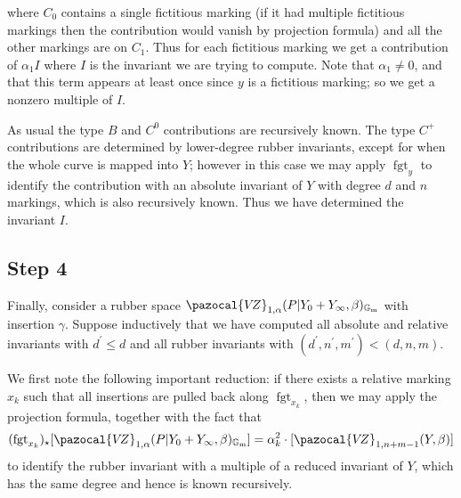 \documentclass[11pt]{amsart}
\newcommand{\sqC}{\scalebox{0.8}[1.3]{$\sqsubset$}}
\newcommand{\VZ}{\pazocal{V\!Z}}
\newcommand{\st}{\star}
\newcommand{\Gm}{\mathbb{G}_{\text{m}}}
\newcommand{\fgt}{\operatorname{fgt}}
\theoremstyle{definition}
\theoremstyle{definition}
\begin{document}
\begin{center}
\end{center}
where $C_0$ contains a single fictitious marking (if it had multiple fictitious markings then the contribution would vanish by projection formula) and all the other markings are on $C_1$. Thus for each fictitious marking we get a contribution of $\alpha_1 I$ where $I$ is the invariant we are trying to compute. Note that $\alpha_1 \neq 0$, and that this term appears at least once since $y$ is a fictitious marking; so we get a nonzero multiple of $I$.

As usual the type $B$ and $C^0$ contributions are recursively known. The type $C^+$ contributions are determined by lower-degree rubber invariants, except for when the whole curve is mapped into $Y$; however in this case we may apply $\fgt_y$ to identify the contribution with an absolute invariant of $Y$ with degree $d$ and $n$ markings, which is also recursively known. Thus we have determined the invariant $I$.

\subsection*{Step 4} Finally, consider a rubber space $\VZ_{1,\alpha}(P|Y_0+Y_\infty,\beta)_{\Gm}$ with insertion $\gamma$. Suppose inductively that we have computed all absolute and relative invariants with $d^\prime \leq d$ and all rubber invariants with $(d^\prime,n^\prime,m^\prime) < (d,n,m)$.

We first note the following important reduction: if there exists a relative marking $x_k$ such that all insertions are pulled back along $\fgt_{x_k}$, then we may apply the projection formula, together with the fact that
\begin{equation*} (\fgt_{x_k})_\st [\VZ_{1,\alpha}(P|Y_0+Y_\infty,\beta)_{\Gm}] = \alpha_k^2 \cdot [\VZ_{1,n+m-1}(Y,\beta)] \end{equation*}
to identify the rubber invariant with a multiple of a reduced invariant of $Y$, which has the same degree and hence is known recursively.
\end{document}
